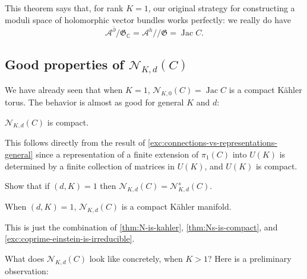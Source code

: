 \documentclass[12pt,letterpaper,reqno]{article}
\numberwithin{equation}{section}
\newcommand{\fG}{{\mathfrak G}}
\newcommand{\cN}{\ensuremath{\mathcal N}}
\newcommand{\cA}{\ensuremath{\mathcal A}}
\newcommand{\C}{\ensuremath{\mathbb C}}
\newcommand{\kahler}{K\"ahler\xspace}
\newcommand{\kq}{/\!\!/}
\DeclareMathOperator{\Jac}{Jac}
\begin{document}
This theorem says that, for rank $K=1$, our original strategy
for constructing a moduli space of holomorphic vector bundles
works perfectly: we really do have
\begin{equation}
  \cA^{\bar\partial} / \fG_\C = \cA^h \kq \fG = \Jac C.
\end{equation}


\subsection{Good properties of \texorpdfstring{$\cN_{K,d}(C)$}{N(K,d)(C)}}

We have already seen that when $K=1$, $\cN_{K,0}(C) = \Jac C$ is a compact
\kahler torus. The behavior is almost as good
for general $K$ and $d$:

\begin{cor}[Compactness of $\cN_{K,d}(C)$] \label{thm:Ns-is-compact}
$\cN_{K,d}(C)$ is compact.
\end{cor}
\begin{pf} This follows directly from the result of
\autoref{exc:connections-vs-representations-general}
since a representation of a finite extension of $\pi_1(C)$ into
$U(K)$ is determined by a finite collection of matrices in $U(K)$,
and $U(K)$ is compact.
\end{pf}

\begin{exercise} \label{exc:coprime-einstein-is-irreducible}
Show that if $(d,K)=1$ then $\cN_{K,d}(C) = \cN_{K,d}^s(C)$.
\end{exercise}

\begin{cor}[$\cN_{K,d}(C)$ is nice when $(d,K)$ = 1]
When $(d,K) = 1$, $\cN_{K,d}(C)$ is a compact
\kahler manifold.
\end{cor}
\begin{pf} This is just the combination of \autoref{thm:N-is-kahler},
\autoref{thm:Ns-is-compact}, and
\autoref{exc:coprime-einstein-is-irreducible}.
\end{pf}

What does $\cN_{K,d}(C)$ look like concretely, when $K>1$? Here is a
preliminary observation:
\end{document}
